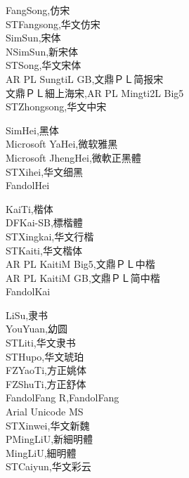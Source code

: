 \documentclass[a4paper,twocolumns,12pt]{article}
\begin{document}
{FangSong,仿宋}\\
{STFangsong,华文仿宋}\\
{SimSun,宋体}\\
{NSimSun,新宋体}\\
{STSong,华文宋体}\\
{AR PL SungtiL GB,文鼎ＰＬ简报宋}\\
{文鼎ＰＬ細上海宋,AR PL Mingti2L Big5}\\
{STZhongsong,华文中宋}

{SimHei,黑体}\\
{Microsoft YaHei,微软雅黑}\\
{Microsoft JhengHei,微軟正黑體}\\
{STXihei,华文细黑}\\
{FandolHei}

{KaiTi,楷体}\\
{DFKai-SB,標楷體}\\
{STXingkai,华文行楷}\\
{STKaiti,华文楷体}\\
{AR PL KaitiM Big5,文鼎ＰＬ中楷}\\
{AR PL KaitiM GB,文鼎ＰＬ简中楷}\\
{FandolKai}

{LiSu,隶书}\\
{YouYuan,幼圆}\\
{STLiti,华文隶书}\\
{STHupo,华文琥珀}\\
{FZYaoTi,方正姚体}\\
{FZShuTi,方正舒体}\\
{FandolFang R,FandolFang}\\
{Arial Unicode MS}\\
{STXinwei,华文新魏}\\
{PMingLiU,新細明體}\\
{MingLiU,細明體}\\
{STCaiyun,华文彩云}\\
\end{document}
